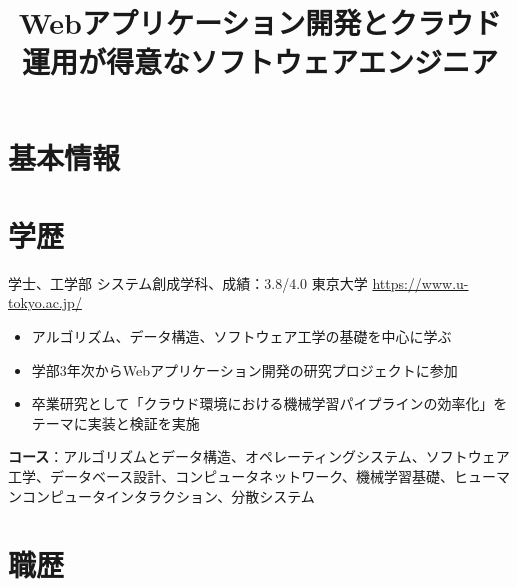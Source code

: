 \documentclass[a4paper, serif, 10pt]{moderncv}
\title{Webアプリケーション開発とクラウド運用が得意なソフトウェアエンジニア}
\begin{document}
\maketitle

\section{基本情報}

\section{学歴}

        {学士、工学部 システム創成学科、成績：3.8/4.0}
        {東京大学}
        {\url{https://www.u-tokyo.ac.jp/}}
        {}
        {\begin{itemize}
\item アルゴリズム、データ構造、ソフトウェア工学の基礎を中心に学ぶ
\item 学部3年次からWebアプリケーション開発の研究プロジェクトに参加
\item 卒業研究として「クラウド環境における機械学習パイプラインの効率化」をテーマに実装と検証を実施
\end{itemize}
\textbf{コース}：アルゴリズムとデータ構造、オペレーティングシステム、ソフトウェア工学、データベース設計、コンピュータネットワーク、機械学習基礎、ヒューマンコンピュータインタラクション、分散システム}
\section{職歴}
\end{document}

